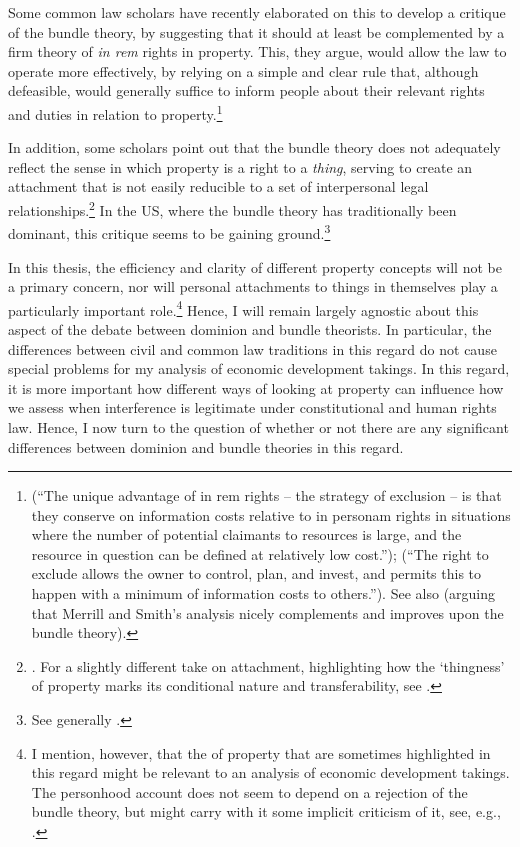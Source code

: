 Some common law scholars have recently elaborated on this to develop a critique of the bundle theory, by suggesting that it should at least be complemented by a firm theory of {\it in rem} rights in property. This, they argue, would allow the law to operate more effectively, by relying on a simple and clear rule that, although defeasible, would generally suffice to inform people about their relevant rights and duties in relation to property.\footnote{\cite[793]{merrill01b} (``The unique advantage of in rem rights -- the strategy of exclusion -- is that they conserve on information costs relative to in personam rights in situations where the number of potential claimants to resources is large, and the resource in question can be defined at relatively low cost.''); \cite[389]{merrill01} (``The right to exclude allows the owner to control, plan, and invest, and permits this to happen with a minimum of information costs to others.''). See also \cite{ellickson11} (arguing that Merrill and Smith's analysis nicely complements and improves upon the bundle theory).} 

In addition, some scholars point out that the bundle theory does not adequately reflect the sense in which property is a right to a {\it thing}, serving to create an attachment that is not easily reducible to a set of interpersonal legal relationships.\footnote{\cite[1862]{merrill07}. For a slightly different take on attachment, highlighting how the `thingness' of property marks its conditional nature and transferability, see \cite[799-818]{penner96}.} In the US, where the bundle theory has traditionally been dominant, this critique seems to be gaining ground.\footnote{See generally \cite{klein11}.}

In this thesis, the efficiency and clarity of different property concepts will not be a primary concern, nor will personal attachments to things in themselves play a particularly important role.\footnote{I mention, however, that the  of property that are sometimes highlighted in this regard might be relevant to an analysis of economic development takings. The personhood account does not seem to depend on a rejection of the bundle theory, but might carry with it some implicit criticism of it, see, e.g., \cite[127-130]{radin93}.} Hence, I will remain largely agnostic about this aspect of the debate between dominion and bundle theorists. In particular, the differences between civil and common law traditions in this regard do not cause special problems for my analysis of economic development takings. In this regard, it is more important how different ways of looking at property can influence how we assess when interference is legitimate under constitutional and human rights law. Hence, I now turn to the question of whether or not there are any significant differences between dominion and bundle theories in this regard.

